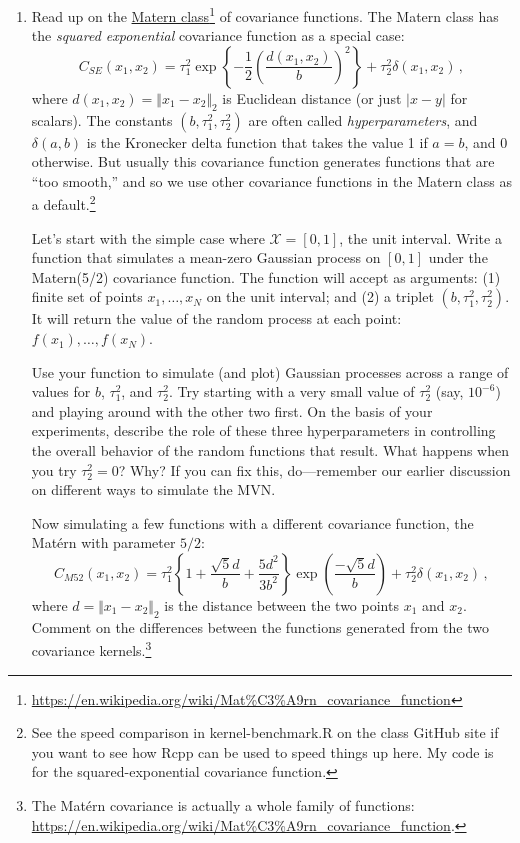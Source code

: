 \documentclass{homework}
\begin{document}
\begin{enumerate}[label=(\Alph*)]
\item   Read up on the \href{https://en.wikipedia.org/wiki/Mat\%C3\%A9rn_covariance_function}{Matern class}\footnote{\url{https://en.wikipedia.org/wiki/Mat\%C3\%A9rn_covariance_function}} of covariance functions.  The Matern class has the \textit{squared exponential} covariance function as a special case:
$$
C_{SE}(x_1, x_2) = \tau_1^2 \exp \left\{ - \frac{1}{2} \left( \frac{d(x_1, x_2)}{b} \right)^2 \right\} + \tau^2_2 \delta(x_1, x_2) \, ,
$$
where $d(x_1, x_2) = \Vert x_1 - x_2 \Vert_2$ is Euclidean distance (or just $|x-y|$ for scalars).  The constants $(b, \tau^2_1, \tau^2_2)$ are often called \textit{hyperparameters}, and $\delta(a,b)$ is the Kronecker delta function that takes the value 1 if $a=b$, and 0 otherwise.  But usually this covariance function generates functions that are ``too smooth,'' and so we use other covariance functions in the Matern class as a default.\footnote{See the speed comparison in kernel-benchmark.R on the class GitHub site if you want to see how Rcpp can be used to speed things up here.  My code is for the squared-exponential covariance function.}

Let's start with the simple case where $\mathcal{X} = [0,1]$, the unit interval.  Write a function that simulates a mean-zero Gaussian process on $[0,1]$ under the Matern(5/2) covariance function.  The function will accept as arguments: (1) finite set of points $x_1, \ldots, x_N$ on the unit interval; and (2) a triplet $(b, \tau^2_1, \tau^2_2)$. It will return the value of the random process at each point: $f(x_1), \ldots, f(x_N)$.

Use your function to simulate (and plot) Gaussian processes across a range of values for $b$, $\tau^2_1$, and $\tau^2_2$.  Try starting with a very small value of $\tau^2_2$ (say, $10^{-6}$) and playing around with the other two first.  On the basis of your experiments, describe the role of these three hyperparameters in controlling the overall behavior of the random functions that result.  What happens when you try $\tau^2_2 = 0$? Why?  If you can fix this, do---remember our earlier discussion on different ways to simulate the MVN.

Now simulating a few functions with a different covariance function, the Mat\'ern with parameter $5/2$:
$$
C_{M52}(x_1, x_2) = \tau_1^2 \left\{ 1 + \frac{\sqrt{5}d}{b} + \frac{5d^2}{3b^2} \right\} \exp\left( \frac{-\sqrt{5}d}{b} \right) + \tau^2_2 \delta(x_1, x_2) \, ,
$$
where $d = \Vert x_1 - x_2 \Vert_2$ is the distance between the two points $x_1$ and $x_2$.  Comment on the differences between the functions generated from the two covariance kernels.\footnote{The Mat\'ern covariance is actually a whole family of functions: \url{https://en.wikipedia.org/wiki/Mat\%C3\%A9rn_covariance_function}.}


\end{enumerate}
\end{document}
